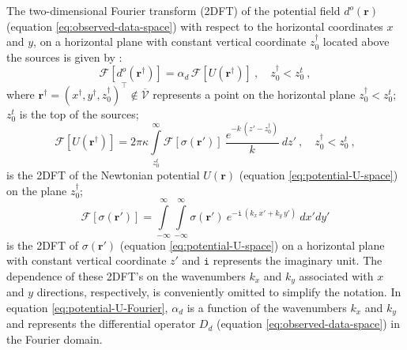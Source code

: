 The two-dimensional Fourier transform (2DFT) of the potential field $d^{o}(\mathbf{r})$ 
(equation \ref{eq:observed-data-space}) with respect to the horizontal coordinates $x$ and
$y$, on a horizontal plane with constant vertical coordinate $z^{\dagger}_{0}$ located above
the sources is given by \citep[e.g.,][]{bhattacharyya1967,gunn1975}:
\begin{equation}
	\mathcal{F} [ d^{o}(\mathbf{r}^{\dagger}) ] =
	\alpha_{d} \, \mathcal{F} [ U(\mathbf{r}^{\dagger}) ] \: ,
	\quad z^{\dagger}_{0} < z^{t}_{0} \: ,
	\label{eq:observed-data-Fourier}
\end{equation}
where $\mathbf{r}^{\dagger} = (x^{\dagger}, y^{\dagger}, z^{\dagger}_{0})^{\top} \notin
\overline{\mathcal{V}}$ represents a point on the horizontal plane $z^{\dagger}_{0} < z^{t}_{0}$;
$z^{t}_{0}$ is the top of the sources;
\begin{equation}
	\mathcal{F} [ U(\mathbf{r}^{\dagger}) ] = 2 \pi \kappa 
	\int\limits_{z^{t}_{0}}^{\infty}
	\mathcal{F} [ \sigma(\mathbf{r}') ] \:
	\frac{e^{- k \, (z' - z^{\dagger}_{0})}}{k}
	\: dz' \: , \quad z^{\dagger}_{0} < z^{t}_{0} \: ,
	\label{eq:potential-U-Fourier}
\end{equation}
is the 2DFT of the Newtonian potential $U(\mathbf{r})$ (equation \ref{eq:potential-U-space})
on the plane $z^{\dagger}_{0}$;
\begin{equation}
	\mathcal{F} [ \sigma(\mathbf{r}') ] = 
	\int\limits_{-\infty}^{\infty}\int\limits_{-\infty}^{\infty}
	\sigma(\mathbf{r}') \: e^{-\mathtt{i} \, (k_{x} \, x' + k_{y} \, y')}
	\: dx'dy'
	\label{eq:sigma-Fourier}
\end{equation}
is the 2DFT of $\sigma(\mathbf{r}')$ 
(equation \ref{eq:potential-U-space}) on a horizontal plane with constant vertical
coordinate $z'$ and $\mathtt{i}$ represents the imaginary unit.
The dependence of these 2DFT's on the wavenumbers $k_{x}$ and $k_{y}$ associated with 
$x$ and $y$ directions, respectively, is conveniently omitted to simplify the notation.
In equation \ref{eq:potential-U-Fourier}, $\alpha_{d}$ is a function of the 
wavenumbers $k_{x}$ and $k_{y}$ and represents the differential operator 
$D_{d}$ (equation \ref{eq:observed-data-space}) in the Fourier domain.

